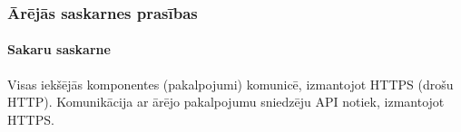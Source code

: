 \subsubsection{Ārējās saskarnes prasības}



%

\paragraph{Sakaru saskarne}

Visas iekšējās komponentes (pakalpojumi) komunicē, izmantojot HTTPS (drošu HTTP).
Komunikācija ar ārējo pakalpojumu sniedzēju API notiek, izmantojot HTTPS.

